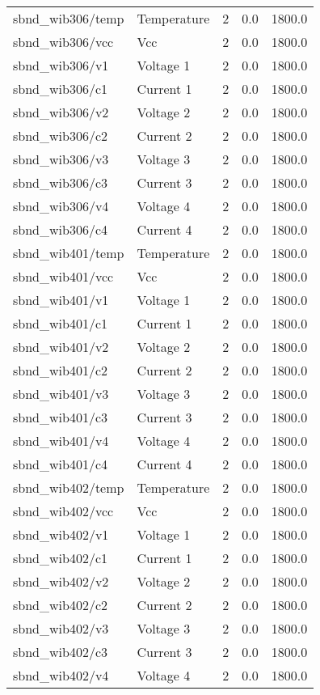\begin{center}
\begin{longtable}{l | l l l l }
sbnd\_wib306/temp & Temperature & 2 & 0.0 & 1800.0\\ 
sbnd\_wib306/vcc & Vcc & 2 & 0.0 & 1800.0\\ 
sbnd\_wib306/v1 & Voltage 1 & 2 & 0.0 & 1800.0\\ 
sbnd\_wib306/c1 & Current 1 & 2 & 0.0 & 1800.0\\ 
sbnd\_wib306/v2 & Voltage 2 & 2 & 0.0 & 1800.0\\ 
sbnd\_wib306/c2 & Current 2 & 2 & 0.0 & 1800.0\\ 
sbnd\_wib306/v3 & Voltage 3 & 2 & 0.0 & 1800.0\\ 
sbnd\_wib306/c3 & Current 3 & 2 & 0.0 & 1800.0\\ 
sbnd\_wib306/v4 & Voltage 4 & 2 & 0.0 & 1800.0\\ 
sbnd\_wib306/c4 & Current 4 & 2 & 0.0 & 1800.0\\ 
sbnd\_wib401/temp & Temperature & 2 & 0.0 & 1800.0\\ 
sbnd\_wib401/vcc & Vcc & 2 & 0.0 & 1800.0\\ 
sbnd\_wib401/v1 & Voltage 1 & 2 & 0.0 & 1800.0\\ 
sbnd\_wib401/c1 & Current 1 & 2 & 0.0 & 1800.0\\ 
sbnd\_wib401/v2 & Voltage 2 & 2 & 0.0 & 1800.0\\ 
sbnd\_wib401/c2 & Current 2 & 2 & 0.0 & 1800.0\\ 
sbnd\_wib401/v3 & Voltage 3 & 2 & 0.0 & 1800.0\\ 
sbnd\_wib401/c3 & Current 3 & 2 & 0.0 & 1800.0\\ 
sbnd\_wib401/v4 & Voltage 4 & 2 & 0.0 & 1800.0\\ 
sbnd\_wib401/c4 & Current 4 & 2 & 0.0 & 1800.0\\ 
sbnd\_wib402/temp & Temperature & 2 & 0.0 & 1800.0\\ 
sbnd\_wib402/vcc & Vcc & 2 & 0.0 & 1800.0\\ 
sbnd\_wib402/v1 & Voltage 1 & 2 & 0.0 & 1800.0\\ 
sbnd\_wib402/c1 & Current 1 & 2 & 0.0 & 1800.0\\ 
sbnd\_wib402/v2 & Voltage 2 & 2 & 0.0 & 1800.0\\ 
sbnd\_wib402/c2 & Current 2 & 2 & 0.0 & 1800.0\\ 
sbnd\_wib402/v3 & Voltage 3 & 2 & 0.0 & 1800.0\\ 
sbnd\_wib402/c3 & Current 3 & 2 & 0.0 & 1800.0\\ 
sbnd\_wib402/v4 & Voltage 4 & 2 & 0.0 & 1800.0\\ 

\end{longtable}
\end{center}
